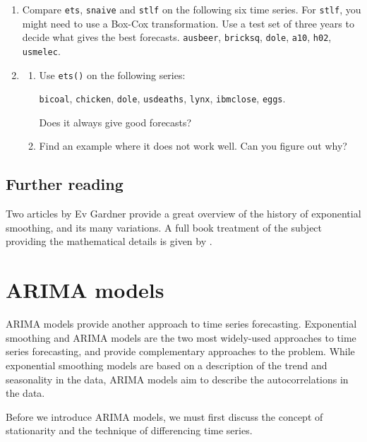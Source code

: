\documentclass[]{book}
\begin{document}
\begin{enumerate}
\def\labelenumi{\arabic{enumi}.}
\setcounter{enumi}{12}
\item
  Compare \texttt{ets}, \texttt{snaive} and \texttt{stlf} on the following six time series. For \texttt{stlf}, you might need to use a Box-Cox transformation. Use a test set of three years to decide what gives the best forecasts.
  \texttt{ausbeer}, \texttt{bricksq}, \texttt{dole}, \texttt{a10}, \texttt{h02}, \texttt{usmelec}.
\item
  \begin{enumerate}
  \def\labelenumii{\alph{enumii}.}
  \item
    Use \texttt{ets()} on the following series:

    \texttt{bicoal}, \texttt{chicken}, \texttt{dole}, \texttt{usdeaths}, \texttt{lynx}, \texttt{ibmclose}, \texttt{eggs}.

    Does it always give good forecasts?
  \item
    Find an example where it does not work well. Can you figure out why?
  \end{enumerate}
\end{enumerate}

\hypertarget{further-reading-5}{%
\section{Further reading}\label{further-reading-5}}

Two articles by Ev Gardner \citep{Gar1985, Gar2006} provide a great overview of the history of exponential smoothing, and its many variations. A full book treatment of the subject providing the mathematical details is given by \citet{expsmooth08}.

\hypertarget{ch-arima}{%
\chapter{ARIMA models}\label{ch-arima}}

ARIMA models provide another approach to time series forecasting. Exponential smoothing and ARIMA models are the two most widely-used approaches to time series forecasting, and provide complementary approaches to the problem. While exponential smoothing models are based on a description of the trend and seasonality in the data, ARIMA models aim to describe the autocorrelations in the data.

Before we introduce ARIMA models, we must first discuss the concept of stationarity and the technique of differencing time series.
\end{document}
